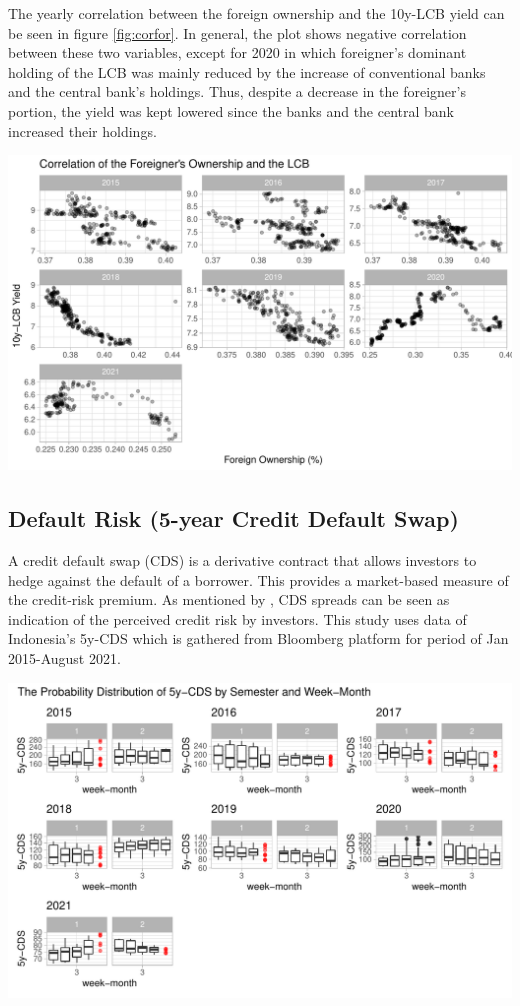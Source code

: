 \documentclass[11pt,a4paper,]{article}
\begin{document}
The yearly correlation between the foreign ownership and the 10y-LCB yield can be seen in figure \ref{fig:corfor}. In general, the plot shows negative correlation between these two variables, except for 2020 in which foreigner's dominant holding of the LCB was mainly reduced by the increase of conventional banks and the central bank's holdings. Thus, despite a decrease in the foreigner's portion, the yield was kept lowered since the banks and the central bank increased their holdings.

\includegraphics{Untitled_files/figure-latex/corfor-1.pdf}

\hypertarget{default-risk-5-year-credit-default-swap}{%
\subsection{Default Risk (5-year Credit Default Swap)}\label{default-risk-5-year-credit-default-swap}}

A credit default swap (CDS) is a derivative contract that allows investors to hedge against the default of a borrower. This provides a market-based measure of the credit-risk premium. As mentioned by \textcite{codogno}, CDS spreads can be seen as indication of the perceived credit risk by investors. This study uses data of Indonesia's 5y-CDS which is gathered from Bloomberg platform for period of Jan 2015-August 2021.

\includegraphics{Untitled_files/figure-latex/cds-1.pdf}
\end{document}
